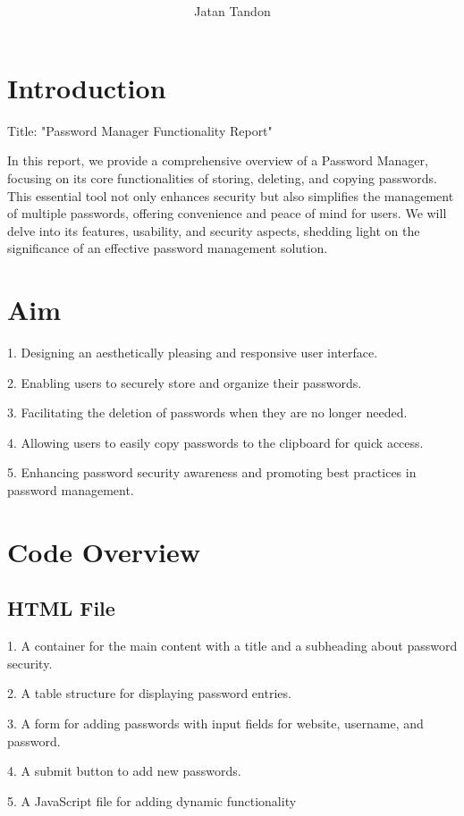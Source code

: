 \documentclass{article}
\title{\textbf{\underline\centering{PASSWORD MANAGER REPORT }}}
\author{Jatan Tandon}
\begin{document}
\maketitle


\section{Introduction}
Title: "Password Manager Functionality Report"

In this report, we provide a comprehensive overview of a Password Manager, focusing on its core functionalities of storing, deleting, and copying passwords. This essential tool not only enhances security but also simplifies the management of multiple passwords, offering convenience and peace of mind for users. We will delve into its features, usability, and security aspects, shedding light on the significance of an effective password management solution.
\section{Aim}
\begin{itemsize}
\item 1. Designing an aesthetically pleasing and responsive user interface.
\item 2. Enabling users to securely store and organize their passwords.
\item 3. Facilitating the deletion of passwords when they are no  longer needed.
\item 4. Allowing users to easily copy passwords to the clipboard for quick access.
 \item 5. Enhancing password security awareness and promoting best practices in   password management.
\end{itemsize}
\section{Code Overview}

\subsection{HTML File}
\begin{itemsize}
 \item 1. A container for the main content with a title and a subheading about password security.
 \item 2. A table structure for displaying password entries.
 \item 3. A form for adding passwords with input fields for website, username, and password.
 \item 4. A submit button to add new passwords.
 \item 5. A JavaScript file for adding dynamic functionality


\end{itemsize}
\end{document}
